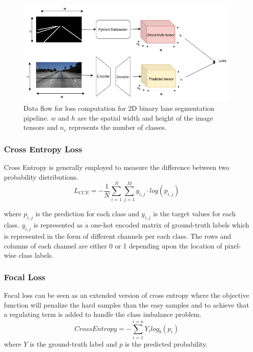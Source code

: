                  \begin{figure}[h]
    \centering
    \includegraphics[width=13cm]{images/2d_dataflow_loss_computation.jpg}
    \caption{Data flow for loss computation for 2D binary lane segmentation pipeline. $w$ and $h$ are the spatial width and height of the image tensors and $n_{c}$ represents the number of classes.}
    \end{figure}
        
        \subsubsection{Cross Entropy Loss}
        Cross Entropy is generally employed to measure the difference between two probability distributions.
        \begin{equation}
        L_{CCE} = -\frac{1}{N}\sum_{i=1}^{N} \sum^{M}_{j=1}y_{i,j}\cdot log(p_{i,j})
        \end{equation}
        
        where $p_{i,j}$ is the prediction for each class and $y_{i,j}$ is the target values for each class. $y_{i,j}$ is represented as a one-hot encoded matrix of ground-truth labels which is represented in the form of different channels per each class. The rows and columns of each channel are either 0 or 1 depending upon the location of pixel-wise class labels. 
       
        \subsubsection{Focal Loss}
        Focal loss can be seen as an extended version of cross entropy where the objective function will penalize the hard samples than the easy samples and to achieve that a regulating term is added to handle the class imbalance problem.
        \begin{equation}
            Cross Entropy = - \sum^{i=n}_{i=1}Y_{i}log_{b}(p_{i})
        \end{equation}
        where $Y$ is the ground-truth label and $p$ is the predicted probability.
        
